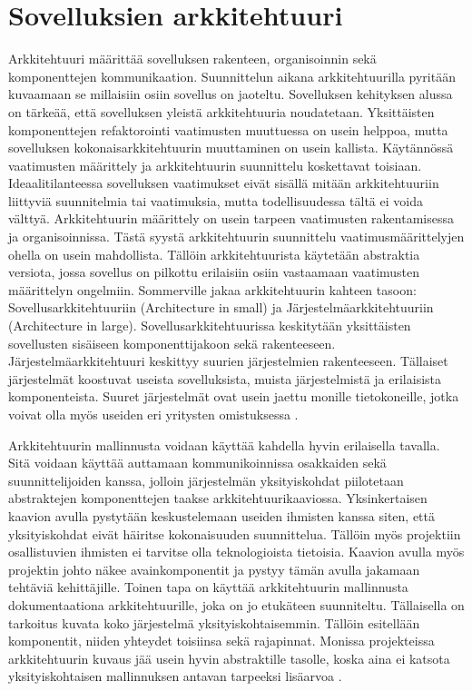 \documentclass[utf8]{gradu3}
\begin{document}
\chapter{Sovelluksien arkkitehtuuri}
Arkkitehtuuri määrittää sovelluksen rakenteen, organisoinnin sekä komponenttejen kommunikaation. Suunnittelun aikana arkkitehtuurilla pyritään kuvaamaan se millaisiin osiin sovellus on jaoteltu. Sovelluksen kehityksen alussa on tärkeää, että sovelluksen yleistä arkkitehtuuria noudatetaan. Yksittäisten komponenttejen refaktorointi vaatimusten muuttuessa on usein helppoa, mutta sovelluksen kokonaisarkkitehtuurin muuttaminen on usein kallista. Käytännössä vaatimusten määrittely ja arkkitehtuurin suunnittelu koskettavat toisiaan. Ideaalitilanteessa sovelluksen vaatimukset eivät sisällä mitään arkkitehtuuriin liittyviä suunnitelmia tai vaatimuksia, mutta todellisuudessa tältä ei voida välttyä. Arkkitehtuurin määrittely on usein tarpeen vaatimusten rakentamisessa ja organisoinnissa. Tästä syystä arkkitehtuurin suunnittelu vaatimusmäärittelyjen ohella on usein mahdollista. Tällöin arkkitehtuurista käytetään abstraktia versiota, jossa sovellus on pilkottu erilaisiin osiin vastaamaan vaatimusten määrittelyn ongelmiin. Sommerville jakaa arkkitehtuurin kahteen tasoon: Sovellusarkkitehtuuriin (Architecture in small) ja Järjestelmäarkkitehtuuriin (Architecture in large). Sovellusarkkitehtuurissa keskitytään yksittäisten sovellusten sisäiseen komponenttijakoon sekä rakenteeseen.  Järjestelmäarkkitehtuuri keskittyy suurien järjestelmien rakenteeseen. Tällaiset järjestelmät koostuvat useista sovelluksista, muista järjestelmistä ja erilaisista komponenteista. Suuret järjestelmät ovat usein jaettu monille tietokoneille, jotka voivat olla myös useiden eri yritysten omistuksessa \parencite[s. 148]{Sommerville}.

Arkkitehtuurin mallinnusta voidaan käyttää kahdella hyvin erilaisella tavalla. Sitä voidaan käyttää auttamaan kommunikoinnissa osakkaiden sekä suunnittelijoiden kanssa, jolloin järjestelmän yksityiskohdat piilotetaan abstraktejen komponenttejen taakse arkkitehtuurikaaviossa. Yksinkertaisen kaavion avulla pystytään keskustelemaan useiden ihmisten kanssa siten, että yksityiskohdat eivät häiritse kokonaisuuden suunnittelua. Tällöin myös projektiin osallistuvien ihmisten ei tarvitse olla teknologioista tietoisia. Kaavion avulla myös projektin johto näkee avainkomponentit ja pystyy tämän avulla jakamaan tehtäviä kehittäjille. Toinen tapa on käyttää arkkitehtuurin mallinnusta dokumentaationa arkkitehtuurille, joka on jo etukäteen suunniteltu. Tällaisella on tarkoitus kuvata koko järjestelmä yksityiskohtaisemmin. Tällöin esitellään komponentit, niiden yhteydet toisiinsa sekä rajapinnat. Monissa projekteissa arkkitehtuurin kuvaus jää usein hyvin abstraktille tasolle, koska aina ei katsota yksityiskohtaisen mallinnuksen antavan tarpeeksi lisäarvoa \parencite[s. 150]{Sommerville}.
\end{document}
